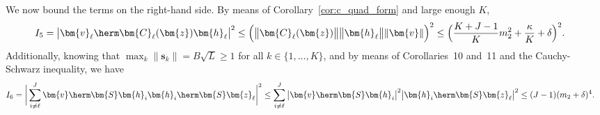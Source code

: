 			We now bound the terms on the right-hand side. By means of Corollary~\ref{cor:c_quad_form} and large enough $K$,
			\begin{align}
				I_5&=\big|\bm{v}_{\ell}\herm\bm{C}_{\ell}(\bm{z})\bm{h}_{\ell}\big|^2\leq\Big(\big\|\bm{C}_{\ell}(\bm{z})\big\|\big\|\bm{h}_{\ell}\big\|\|\bm{v}\|\Big)^2\leq\Big(\frac{K+J-1}{K}m_2^2+\frac{\kappa}{K}+\delta\Big)^2.\nonumber
			\end{align} 
			Additionally, knowing that $\max_k\|\bm{s}_k\|=B\sqrt{L}\geq1$ for all $k\in\{1,\ldots,K\}$, and by means of Corollaries~10 and~11 and the Cauchy-Schwarz inequality, we have
			\begin{align}
				I_6&=\bigg|\sum_{i\neq {\ell}}^J\bm{v}\herm\bm{S}\bm{h}_i\bm{h}_i\herm\bm{S}\bm{z}_{\ell}\bigg|^2
				\leq\sum_{i\neq {\ell}}^J\big|\bm{v}\herm\bm{S}\bm{h}_i\big|^2\big|\bm{h}_i\herm\bm{S}\bm{z}_{\ell}\big|^2
				\leq(J-1)(m_2+\delta)^4.
			\end{align}
